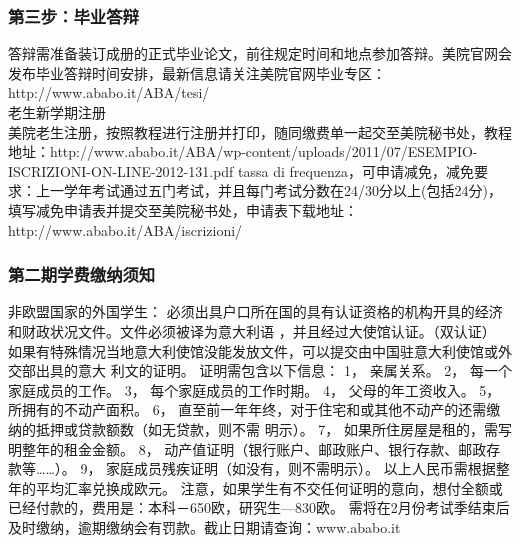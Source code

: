 \subsubsection{第三步：毕业答辩}
答辩需准备装订成册的正式毕业论文，前往规定时间和地点参加答辩。美院官网会发布毕业答辩时间安排，最新信息请关注美院官网毕业专区：http://www.ababo.it/ABA/tesi/\\


老生新学期注册\\
美院老生注册，按照教程进行注册并打印，随同缴费单一起交至美院秘书处，教程地址：http://www.ababo.it/ABA/wp-content/uploads/2011/07/ESEMPIO-ISCRIZIONI-ON-LINE-2012-131.pdf
tassa di frequenza，可申请减免，减免要求：上一学年考试通过五门考试，并且每门考试分数在24/30分以上(包括24分)，填写减免申请表并提交至美院秘书处，申请表下载地址：http://www.ababo.it/ABA/iscrizioni/

\subsubsection{第二期学费缴纳须知}
非欧盟国家的外国学生： 必须出具户口所在国的具有认证资格的机构开具的经济和财政状况文件。文件必须被译为意大利语 ，并且经过大使馆认证。（双认证） 如果有特殊情况当地意大利使馆没能发放文件，可以提交由中国驻意大利使馆或外交部出具的意大 利文的证明。 证明需包含以下信息： 1， 亲属关系。 2， 每一个家庭成员的工作。 3， 每个家庭成员的工作时期。 4， 父母的年工资收入。 5， 所拥有的不动产面积。 6， 直至前一年年终，对于住宅和或其他不动产的还需缴纳的抵押或贷款额数（如无贷款，则不需 明示）。 7， 如果所住房屋是租的，需写明整年的租金金额。 8， 动产值证明（银行账户、邮政账户、银行存款、邮政存款等……）。 9， 家庭成员残疾证明（如没有，则不需明示）。 以上人民币需根据整年的平均汇率兑换成欧元。 注意，如果学生有不交任何证明的意向，想付全额或已经付款的，费用是：本科－650欧，研究生—830欧。 需将在2月份考试季结束后及时缴纳，逾期缴纳会有罚款。截止日期请查询：www.ababo.it


